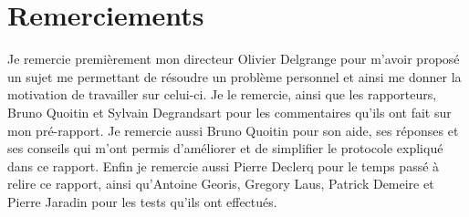 \documentclass[12pt,a4paper,oneside, titlepage]{report}
\begin{document}
{}


\section*{Remerciements}
\renewcommand{\leftmark}{REMERCIEMENTS}

Je remercie premièrement mon directeur Olivier Delgrange pour m'avoir
proposé un sujet me permettant de résoudre un problème personnel
et ainsi me donner la motivation de travailler sur celui-ci. Je le remercie,
ainsi que les rapporteurs, Bruno Quoitin et Sylvain Degrandsart pour les
commentaires qu'ils ont fait sur mon pré-rapport. Je remercie aussi
Bruno Quoitin pour son aide, ses réponses et ses conseils qui m'ont permis
d'améliorer et de simplifier le protocole expliqué dans ce rapport.
Enfin je remercie aussi Pierre Declerq pour le temps passé à relire
ce rapport, ainsi qu'Antoine Georis, Gregory Laus, Patrick Demeire et Pierre
Jaradin pour les tests qu'ils ont effectués.\\

\newpage
\renewcommand{\leftmark}{TABLE DES MATI\`{E}RES}
\thispagestyle{fancy}
\tableofcontents

\newpage
{}







% 
% 
% 

% 

\printbibliography

\newpage
\appendix
{}

\end{document}
